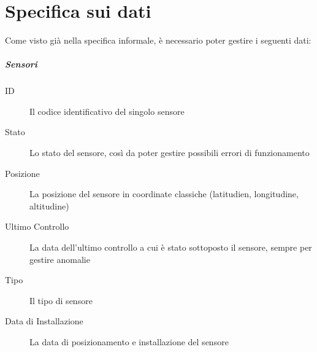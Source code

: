 \section{Specifica sui dati}
Come visto già nella specifica informale, è necessario poter gestire i seguenti dati:
\subparagraph{Sensori}
\begin{description}
        \item[ID] Il codice identificativo del singolo sensore
        \item[Stato] Lo stato del sensore, così da poter gestire possibili
        errori di funzionamento
        \item[Posizione] La posizione del sensore in coordinate classiche
        (latitudien, longitudine, altitudine)
        \item[Ultimo Controllo] La data dell'ultimo controllo a cui è stato
        sottoposto il sensore, sempre per gestire anomalie
        \item[Tipo] Il tipo di sensore
        \item[Data di Installazione] La data di posizionamento e installazione
        del sensore
\end{description}

